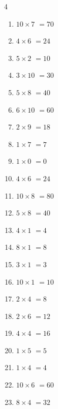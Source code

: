 \begin{multicols}{4}
\begin{enumerate}
  \item $10\times 7$
        $=70$

  \item $4\times 6$
        $=24$

  \item $5\times 2$
        $=10$

  \item $3\times 10$
        $=30$

  \item $5\times 8$
        $=40$

  \item $6\times 10$
        $=60$

  \item $2\times 9$
        $=18$

  \item $1\times 7$
        $=7$

  \item $1\times 0$
        $=0$

  \item $4\times 6$
        $=24$

  \item $10\times 8$
        $=80$

  \item $5\times 8$
        $=40$

  \item $4\times 1$
        $=4$

  \item $8\times 1$
        $=8$

  \item $3\times 1$
        $=3$

  \item $10\times 1$
        $=10$

  \item $2\times 4$
        $=8$

\columnbreak %

  \item $2\times 6$
        $=12$

  \item $4\times 4$
        $=16$

  \item $1\times 5$
        $=5$

  \item $1\times 4$
        $=4$

  \item $10\times 6$
        $=60$

  \item $8\times 4$
        $=32$


\end{enumerate}
\end{multicols}
